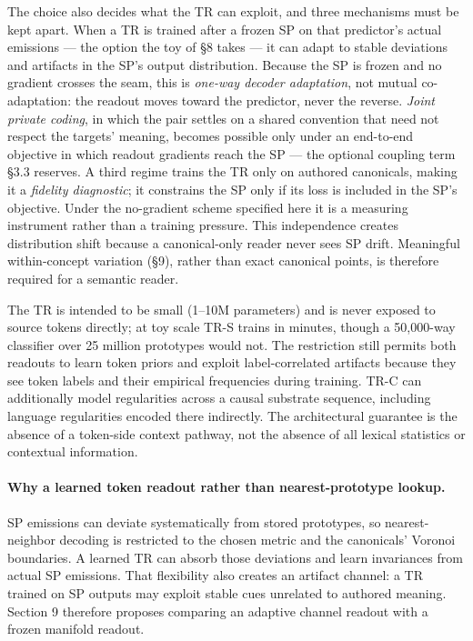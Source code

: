 \documentclass[11pt,a4paper]{article}
\begin{document}
The choice also decides what the TR can exploit, and three mechanisms must be kept apart. When a TR is trained after a frozen SP on that predictor's actual emissions --- the option the toy of §8 takes --- it can adapt to stable deviations and artifacts in the SP's output distribution. Because the SP is frozen and no gradient crosses the seam, this is \emph{one-way decoder adaptation}, not mutual co-adaptation: the readout moves toward the predictor, never the reverse. \emph{Joint private coding}, in which the pair settles on a shared convention that need not respect the targets' meaning, becomes possible only under an end-to-end objective in which readout gradients reach the SP --- the optional coupling term §3.3 reserves. A third regime trains the TR only on authored canonicals, making it a \emph{fidelity diagnostic}; it constrains the SP only if its loss is included in the SP's objective. Under the no-gradient scheme specified here it is a measuring instrument rather than a training pressure. This independence creates distribution shift because a canonical-only reader never sees SP drift. Meaningful within-concept variation (§9), rather than exact canonical points, is therefore required for a semantic reader.

The TR is intended to be small (1--10M parameters) and is never exposed to source tokens directly; at toy scale TR-S trains in minutes, though a 50{,}000-way classifier over 25 million prototypes would not. The restriction still permits both readouts to learn token priors and exploit label-correlated artifacts because they see token labels and their empirical frequencies during training. TR-C can additionally model regularities across a causal substrate sequence, including language regularities encoded there indirectly. The architectural guarantee is the absence of a token-side context pathway, not the absence of all lexical statistics or contextual information.

\paragraph{Why a learned token readout rather than nearest-prototype lookup.} SP emissions can deviate systematically from stored prototypes, so nearest-neighbor decoding is restricted to the chosen metric and the canonicals' Voronoi boundaries. A learned TR can absorb those deviations and learn invariances from actual SP emissions. That flexibility also creates an artifact channel: a TR trained on SP outputs may exploit stable cues unrelated to authored meaning. Section 9 therefore proposes comparing an adaptive channel readout with a frozen manifold readout.
\end{document}
